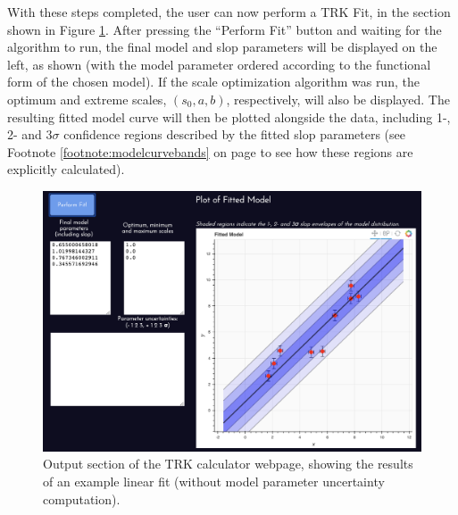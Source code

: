 With these steps completed, the user can now perform a TRK Fit, in the section shown in Figure \ref{fig:websiteoutput}. After pressing the ``Perform Fit'' button and waiting for the algorithm to run, the final model and slop parameters will be displayed on the left, as shown (with the model parameter ordered according to the functional form of the chosen model). If the scale optimization algorithm was run, the optimum and extreme scales, $(s_0,a,b)$, respectively, will also be displayed. The resulting fitted model curve will then be plotted alongside the data, including 1-, 2- and $3\sigma$ confidence regions described by the fitted slop parameters (see Footnote \ref{footnote:modelcurvebands} on page \pageref{footnote:modelcurvebands} to see how these regions are explicitly calculated).
\begin{figure}
    \centering
    \includegraphics[width=1.0\linewidth]{figures/websiteoutput.png}
    \caption{Output section of the TRK calculator webpage, showing the results of an example linear fit (without model parameter uncertainty computation).}
    \label{fig:websiteoutput}
\end{figure}